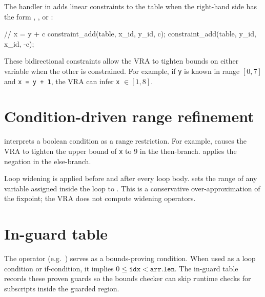 \pnum
The  handler in  adds linear constraints
to the table when the right-hand side has the form , ,
or :

\begin{ccode}
// x = y + c
constraint_add(table, x_id, y_id,  c);
constraint_add(table, y_id, x_id, -c);
\end{ccode}

\pnum
These bidirectional constraints allow the VRA to tighten bounds on either
variable when the other is constrained.  For example, if \texttt{y} is known
in range $[0, 7]$ and \texttt{x = y + 1}, the VRA can infer
\texttt{x} $\in [1, 8]$.

\section{Condition-driven range refinement}
\label{sec:vra-cond}

\pnum
{} interprets a boolean condition as a
range restriction.  For example,  causes the VRA to tighten
the upper bound of \texttt{x} to 9 in the then-branch.
 applies the negation in the else-branch.

\pnum
Loop widening is applied before and after every loop body.
 sets the range of any variable assigned
inside the loop to .  This is a conservative
over-approximation of the fixpoint; the VRA does not compute widening operators.

\section{In-guard table}
\label{sec:vra-inguards}

\pnum
The  operator (e.g.\ ) serves as a bounds-proving
condition.  When used as a loop condition or if-condition, it implies
$0 \leq \mathtt{idx} < \mathtt{arr.len}$.  The in-guard table records these
proven guards so the bounds checker can skip runtime checks for subscripts inside
the guarded region.

